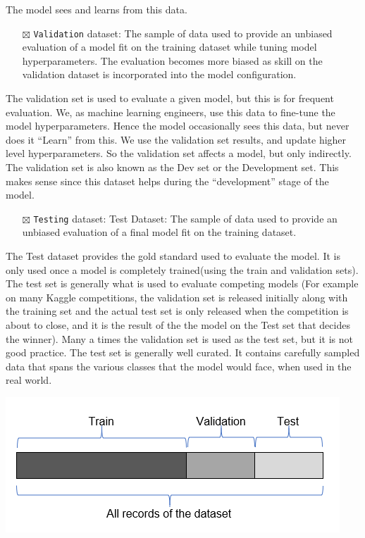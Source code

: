 \documentclass[
  letterpaper,
  DIV=11,
  numbers=noendperiod]{scrreprt}
\providecommand{\tightlist}{%
  \setlength{\itemsep}{0pt}\setlength{\parskip}{0pt}}\usepackage{longtable,booktabs,array}
\begin{document}
The model sees and learns from this data.

\begin{itemize}
\tightlist
\item[$\boxtimes$]
  \texttt{Validation} dataset: The sample of data used to provide an
  unbiased evaluation of a model fit on the training dataset while
  tuning model hyperparameters. The evaluation becomes more biased as
  skill on the validation dataset is incorporated into the model
  configuration.
\end{itemize}

The validation set is used to evaluate a given model, but this is for
frequent evaluation. We, as machine learning engineers, use this data to
fine-tune the model hyperparameters. Hence the model occasionally sees
this data, but never does it ``Learn'' from this. We use the validation
set results, and update higher level hyperparameters. So the validation
set affects a model, but only indirectly. The validation set is also
known as the Dev set or the Development set. This makes sense since this
dataset helps during the ``development'' stage of the model.

\begin{itemize}
\tightlist
\item[$\boxtimes$]
  \texttt{Testing} dataset: Test Dataset: The sample of data used to
  provide an unbiased evaluation of a final model fit on the training
  dataset.
\end{itemize}

The Test dataset provides the gold standard used to evaluate the model.
It is only used once a model is completely trained(using the train and
validation sets). The test set is generally what is used to evaluate
competing models (For example on many Kaggle competitions, the
validation set is released initially along with the training set and the
actual test set is only released when the competition is about to close,
and it is the result of the the model on the Test set that decides the
winner). Many a times the validation set is used as the test set, but it
is not good practice. The test set is generally well curated. It
contains carefully sampled data that spans the various classes that the
model would face, when used in the real world.

\includegraphics{img/da-split/train_test1.png}
\end{document}

